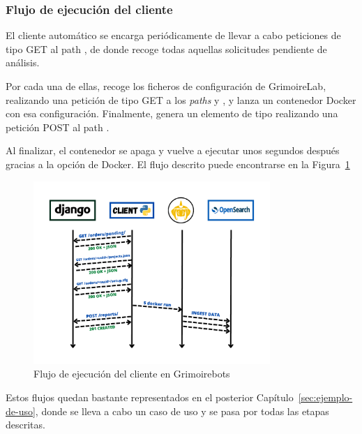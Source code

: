 \subsubsection{Flujo de ejecución del cliente}

El cliente automático se encarga periódicamente de llevar a cabo peticiones de tipo GET al path , de donde recoge todas aquellas solicitudes pendiente de análisis.

Por cada una de ellas, recoge los ficheros de configuración de GrimoireLab, realizando una petición de tipo GET a los \emph{paths}  y , y lanza un contenedor Docker con esa configuración. Finalmente, genera un elemento de tipo  realizando una petición POST al path .

Al finalizar, el contenedor se apaga y vuelve a ejecutar unos segundos después gracias a la opción  de Docker. El flujo descrito puede encontrarse en la Figura~{\ref{fig:grimoirebots_client_workflow}}

\begin{figure}[ht]
    \centering
    \includegraphics[width=0.8\textwidth]{Figures/grimoirebots_ii_backend}
    \decoRule
    \caption[Grimoirebots (flujo del cliente)]{Flujo de ejecución del cliente en Grimoirebots}
    \label{fig:grimoirebots_client_workflow}
\end{figure}

Estos flujos quedan bastante representados en el posterior Capítulo~{\ref{sec:ejemplo-de-uso}}, donde se lleva a cabo un caso de uso y se pasa por todas las etapas descritas.


